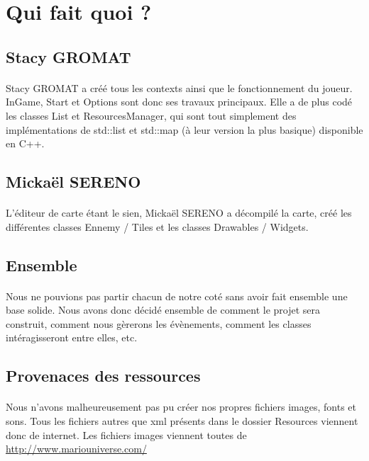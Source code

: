 ﻿\section{Qui fait quoi ?}

\subsection{Stacy GROMAT}
\paragraph{} Stacy GROMAT a créé tous les contexts ainsi que le fonctionnement du joueur. InGame, Start et Options sont donc ses travaux principaux. Elle a de plus codé les classes List et ResourcesManager, qui sont tout simplement des implémentations de std::list et std::map (à leur version la plus basique) disponible en C++. 

\subsection{Mickaël SERENO}
\paragraph{} L'éditeur de carte étant le sien, Mickaël SERENO a décompilé la carte, créé les différentes classes Ennemy / Tiles et les classes Drawables / Widgets.

\subsection{Ensemble}
\paragraph{} Nous ne pouvions pas partir chacun de notre coté sans avoir fait ensemble une base solide. Nous avons donc décidé ensemble de comment le projet sera construit, comment nous gèrerons les évènements, comment les classes intéragisseront entre elles, etc.

\subsection{Provenaces des ressources}
\paragraph{} Nous n'avons malheureusement pas pu créer nos propres fichiers images, fonts et sons. Tous les fichiers autres que xml présents dans le dossier Resources viennent donc de internet. Les fichiers images viennent toutes de \url{http://www.mariouniverse.com/} 
